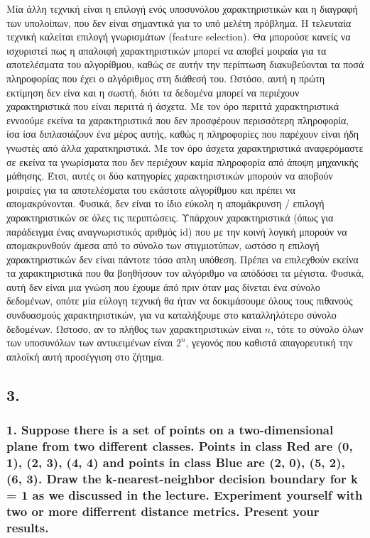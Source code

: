 \documentclass[12pt]{article}
\begin{document}
Μία άλλη τεχνική είναι η επιλογή ενός υποσυνόλου χαρακτηριστικών και η διαγραφή των υπολοίπων, που δεν είναι σημαντικά για το υπό μελέτη πρόβλημα. Η τελευταία τεχνική καλείται επιλογή γνωρισμάτων (feature selection). Θα μπορούσε κανείς να ισχυριστεί πως η απαλοιφή χαρακτηριστικών μπορεί να αποβεί μοιραία για τα αποτελέσματα του αλγορίθμου, καθώς σε αυτήν την περίπτωση διακυβεύονται τα ποσά πληροφορίας που έχει ο αλγόριθμος στη διάθεσή του. Ωστόσο, αυτή η πρώτη εκτίμηση δεν είνα και η σωστή, διότι τα δεδομένα μπορεί να περιέχουν χαρακτηριστικά που είναι περιττά ή άσχετα. Με τον όρο περιττά χαρακτηριστικά εννοούμε εκείνα τα χαρακτηριστικά που δεν προσφέρουν περισσότερη πληροφορία, ίσα ίσα διπλασιάζουν ένα μέρος αυτής, καθώς η πληροφορίες που παρέχουν είναι ήδη γνωστές από άλλα χαρατκηριστικά. Με τον όρο άσχετα χαρακτηριστικά αναφερόμαστε σε εκείνα τα γνωρίσματα που δεν περιέχουν καμία πληροφορία από άποψη μηχανικής μάθησης. Έτσι, αυτές οι δύο κατηγορίες χαρακτηριστικών μπορούν να αποβούν μοιραίες για τα αποτελέσματα του εκάστοτε αλγορίθμου και πρέπει να απομακρύνονται. Φυσικά, δεν είναι το ίδιο εύκολη η απομάκρυνση / επιλογή χαρακτηριστικών σε όλες τις περιπτώσεις. Υπάρχουν χαρακτηριστικά (όπως για παράδειγμα ένας αναγνωριστικός αριθμός id) που με την κοινή λογική μπορούν να απομακρυνθούν άμεσα από το σύνολο των στιγμιοτύπων, ωστόσο η επιλογή χαρακτηριστικών δεν είναι πάντοτε τόσο απλη υπόθεση. Πρέπει να επιλεχθούν εκείνα τα χαρακτηριστικά που θα βοηθήσουν τον αλγόριθμο να απόδόσει τα μέγιστα. Φυσικά, αυτή δεν είναι μια γνώση που έχουμε άπό πριν όταν μας δίνεται ένα σύνολο δεδομένων, οπότε μία εύλογη τεχνική θα ήταν να δοκιμάσουμε όλους τους πιθανούς συνδυασμούς χαρακτηριστικών, για να καταλήξουμε στο καταλληλότερο σύνολο δεδομένων. Ωστοσο, αν το πλήθος των χαρακτηριστικών είναι \(n\), τότε το σύνολο όλων των υποσυνόλων των αντικειμένων είναι \(2^n\), γεγονός που καθιστά απαγορευτική την απλοϊκή αυτή προσέγγιση στο ζήτημα.  \\

\pagebreak

\subsection*{3.}

\subsubsection*{1. Suppose there is a set of points on a two-dimensional plane from two different classes.
	Points in class Red are (0, 1), (2, 3), (4, 4) and points in class Blue are (2, 0), (5, 2),
	(6, 3). Draw the k-nearest-neighbor decision boundary for k = 1 as we discussed in the
	lecture. Experiment yourself with two or more differrent distance metrics. Present your
	results.}
\end{document}
